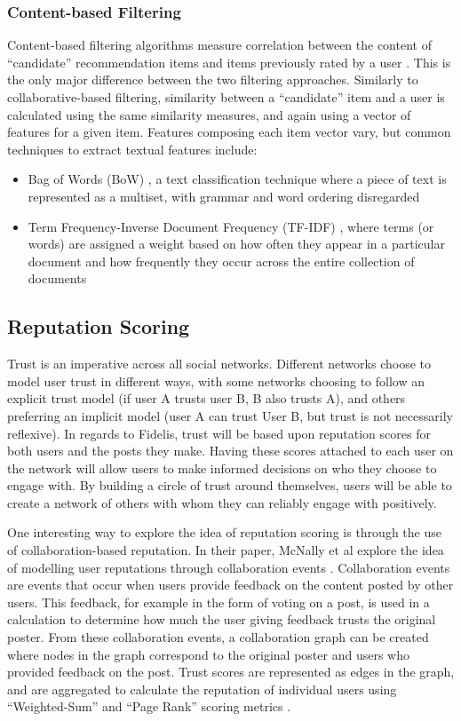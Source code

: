 \subsubsection{Content-based Filtering} 
Content-based filtering algorithms measure correlation between the content of ``candidate'' recommendation items and items previously rated by a user \cite{van2000using}. This is the only major difference between the two filtering approaches. Similarly to collaborative-based filtering, similarity between a ``candidate'' item and a user is calculated using the same similarity measures, and again using a vector of features for a given item. Features composing each item vector vary, but common techniques to extract textual features include:
\begin{itemize}
\item Bag of Words (BoW) \cite{vanetti2010content}, a text classification technique where a piece of text is represented as a multiset, with grammar and word ordering disregarded \cite{scikit:bow}
\item Term Frequency-Inverse Document Frequency (TF-IDF) \cite{van2000using}, where terms (or words) are assigned a weight based on how often they appear in a particular document and how frequently they occur across the entire collection of documents \cite{scikit:tfidf}
\end{itemize} 

\subsection{Reputation Scoring}
Trust is an imperative across all social networks. Different networks choose to model user trust in different ways, with some networks choosing to follow an explicit trust model (if user A trusts user B, B also trusts A), and others preferring an implicit model (user A can trust User B, but trust is not necessarily reflexive). In regards to Fidelis, trust will be based upon reputation scores for both users and the posts they make. Having these scores attached to each user on the network will allow users to make informed decisions on who they choose to engage with. By building a circle of trust around themselves, users will be able to create a network of others with whom they can reliably engage with positively.

One interesting way to explore the idea of reputation scoring is through the use of collaboration-based reputation. In their paper, McNally et al explore the idea of modelling user reputations through collaboration events \cite{mcnally2013}. Collaboration events are events that occur when users provide feedback on the content posted by other users. This feedback, for example in the form of voting on a post, is used in a calculation to determine how much the user giving feedback trusts the original poster. From these collaboration events, a collaboration graph can be created where nodes in the graph correspond to the original poster and users who provided feedback on the post. Trust scores are represented as edges in the graph, and are aggregated to calculate the reputation of individual users using ``Weighted-Sum'' and ``Page Rank'' scoring metrics \cite{mcnally2013}.

